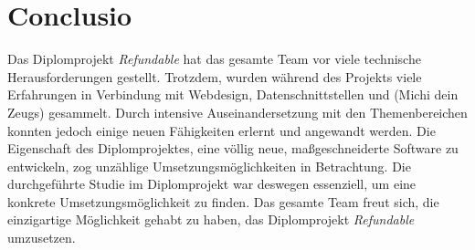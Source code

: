 \chapter{Conclusio}
Das Diplomprojekt \textit{Refundable} hat das gesamte Team vor viele technische Herausforderungen gestellt. Trotzdem, wurden während des Projekts viele Erfahrungen in Verbindung mit Webdesign, Datenschnittstellen und (Michi dein Zeugs) gesammelt. Durch intensive Auseinandersetzung mit den Themenbereichen konnten jedoch einige neuen Fähigkeiten erlernt und angewandt werden. Die Eigenschaft des Diplomprojektes, eine völlig neue, maßgeschneiderte Software zu entwickeln, zog unzählige Umsetzungsmöglichkeiten in Betrachtung. Die durchgeführte Studie im Diplomprojekt war deswegen essenziell, um eine konkrete Umsetzungsmöglichkeit zu finden. Das gesamte Team freut sich, die einzigartige Möglichkeit gehabt zu haben, das Diplomprojekt \textit{Refundable} umzusetzen.